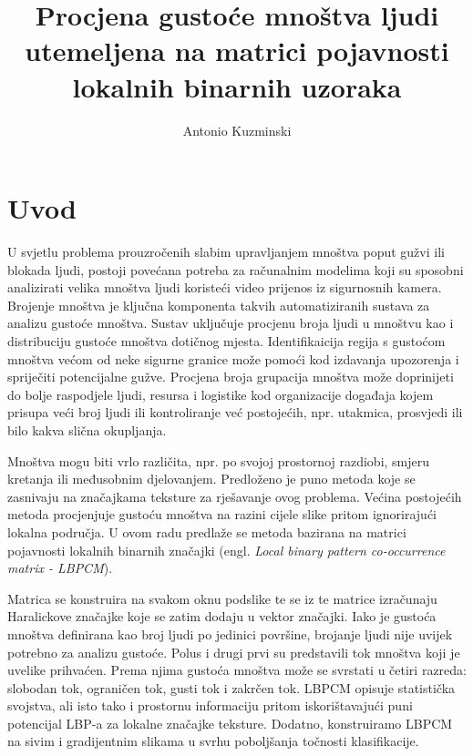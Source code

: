 \documentclass[times, utf8, zavrsni, numeric]{fer}
\begin{document}

\title{Procjena gustoće mnoštva ljudi utemeljena na matrici pojavnosti lokalnih binarnih uzoraka}

\author{Antonio Kuzminski}

\maketitle

\izvornik

\zahvala{}

\tableofcontents

\chapter{Uvod}

U svjetlu problema prouzročenih slabim upravljanjem mnoštva poput
gužvi ili blokada ljudi, postoji povećana potreba za računalnim modelima
koji su sposobni analizirati velika mnoštva ljudi koristeći video prijenos
iz sigurnosnih kamera. Brojenje mnoštva je ključna komponenta takvih 
automatiziranih sustava za analizu gustoće mnoštva. Sustav uključuje 
procjenu broja ljudi u mnoštvu kao i distribuciju gustoće mnoštva
dotičnog mjesta. Identifikaicija regija s gustoćom mnoštva većom
od neke sigurne granice može pomoći kod izdavanja upozorenja i spriječiti
potencijalne gužve. Procjena broja grupacija mnoštva može doprinijeti
do bolje raspodjele ljudi, resursa i logistike kod organizacije događaja
kojem prisupa veći broj ljudi ili kontroliranje već postojećih, npr. 
utakmica, prosvjedi ili bilo kakva slična okupljanja.

\bigbreak

Mnoštva mogu biti vrlo različita, npr. po svojoj prostornoj razdiobi, smjeru kretanja ili međusobnim djelovanjem. Predloženo 
je puno metoda koje se zasnivaju na značajkama teksture za rješavanje ovog
problema. Većina postojećih metoda procjenjuje gustoću mnoštva na razini
cijele slike pritom ignorirajući lokalna područja. U ovom radu predlaže se
metoda bazirana na matrici pojavnosti lokalnih binarnih značajki
(engl. \textit{Local binary pattern co-occurrence matrix - LBPCM}).

\bigbreak

Matrica se konstruira na svakom oknu podslike te se iz te matrice izračunaju 
Haralickove značajke koje se zatim dodaju u vektor značajki. Iako je 
gustoća mnoštva definirana kao broj ljudi po jedinici površine, 
brojanje ljudi nije uvijek potrebno za analizu gustoće. Polus i 
drugi \citep{polus} prvi su predstavili tok mnoštva koji je uvelike prihvaćen. 
Prema njima gustoća mnoštva može se svrstati u četiri razreda: 
slobodan tok, ograničen tok, gusti tok i zakrčen tok. 
LBPCM opisuje statistička svojstva, ali isto tako i prostornu 
informaciju pritom iskorištavajući puni potencijal LBP-a za 
lokalne značajke teksture. Dodatno, konstruiramo LBPCM na sivim i 
gradijentnim slikama u svrhu poboljšanja točnosti klasifikacije.
\end{document}
